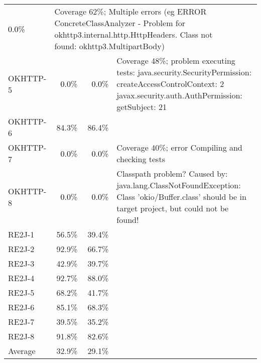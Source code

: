 \begin{tabular}{ l rrrrrrr rrrrrrrr}
                                                             \cellcolor{light-gray} \textcolor{black}{0.0}\%
& \multicolumn{13}{l}{Coverage 62\%; Multiple errors (eg ERROR ConcreteClassAnalyzer - Problem for okhttp3.internal.http.HttpHeaders. Class not found: okhttp3.MultipartBody)}\\ 
OKHTTP-5 & \cellcolor{light-gray} \textcolor{black}{0.0}\% &
                                                             \cellcolor{light-gray} \textcolor{black}{0.0}\%
& \multicolumn{13}{l}{Coverage 48\%; problem executing tests: java.security.SecurityPermission:  createAccessControlContext: 2 javax.security.auth.AuthPermission: getSubject: 21}\\ 
OKHTTP-6 & 84.3\% & 86.4\%\\ 
OKHTTP-7 & \cellcolor{light-gray} \textcolor{black}{0.0}\% &
                                                             \cellcolor{light-gray} \textcolor{black}{0.0}\%
&  \multicolumn{13}{l}{Coverage 40\%; error Compiling and checking tests}\\ 
OKHTTP-8 & \cellcolor{light-gray} \textcolor{black}{0.0}\% &
                                                             \cellcolor{light-gray} \textcolor{black}{0.0}\%
& \multicolumn{13}{l}{Classpath problem? Caused by: java.lang.ClassNotFoundException: Class 'okio/Buffer.class' should be in target project, but could not be found!}\\ 
RE2J-1 & 56.5\% & 39.4\%\\ 
RE2J-2 & 92.9\% & 66.7\%\\ 
RE2J-3 & 42.9\% & 39.7\%\\ 
RE2J-4 & 92.7\% & 88.0\%\\ 
RE2J-5 & 68.2\% & 41.7\%\\ 
RE2J-6 & 85.1\% & 68.3\%\\ 
RE2J-7 & 39.5\% & 35.2\%\\ 
RE2J-8 & 91.8\% & 82.6\%\\ 
\midrule 
Average  &  32.9\% &  29.1\%\\ 
\bottomrule 
\end{tabular} 
